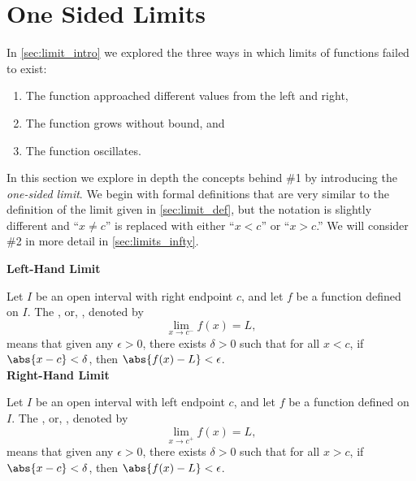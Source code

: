 \section{One Sided Limits}\label{sec:limit_continuity}

In \autoref{sec:limit_intro} we explored the three ways in which limits of functions failed to exist: 
	\begin{enumerate}
	\item	The function approached different values from the left and right,
	\item	The function grows without bound, and 
	\item	The function oscillates.
	\end{enumerate}
	
In this section we explore in depth the concepts behind \#1 by introducing the \textit{one-sided limit}. We begin with formal definitions that are very similar to the definition of the limit given in \autoref{sec:limit_def}, but the notation is slightly different and ``$x\neq c$'' is replaced with either ``$x<c$'' or ``$x>c$.'' We will consider \#2 in more detail in \autoref{sec:limits_infty}.

{\textbf{Left-Hand Limit} 

Let $I$ be an open interval with right endpoint $c$, and let $f$ be a function defined on $I$. %
The , or, , denoted by  
\[\displaystyle \lim_{x\rightarrow c^-} f(x) = L,\]
means that given any $\epsilon > 0$, there exists $\delta > 0$ such that for all $x< c$,  
if  $\abs{x-c}<\delta$, then $\abs{f(x)-L}<\epsilon$.\\

\textbf{Right-Hand Limit}

Let $I$ be an open interval with left endpoint $c$, and let $f$ be a function defined on $I$. %
The , or, , denoted by  
\[\displaystyle \lim_{x\rightarrow c^+} f(x) = L,\]
means that given any $\epsilon > 0$, there exists $\delta > 0$ such that for all $x> c$,  
if  $\abs{x-c}<\delta$, then $\abs{f(x)-L}<\epsilon$.
}

